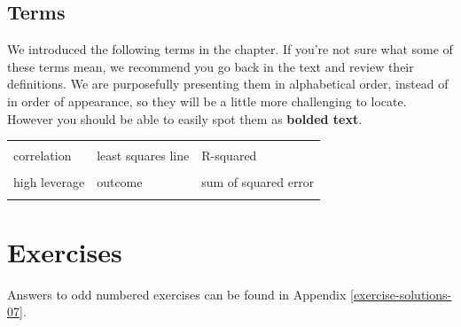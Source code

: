 \documentclass[
  10pt,
  openany]{book}
\begin{document}
\hypertarget{terms-4}{%
\subsection{Terms}\label{terms-4}}

We introduced the following terms in the chapter.
If you're not sure what some of these terms mean, we recommend you go back in the text and review their definitions.
We are purposefully presenting them in alphabetical order, instead of in order of appearance, so they will be a little more challenging to locate.
However you should be able to easily spot them as \textbf{bolded text}.

\begin{tabu} to 
\toprule
{} &  & \\
correlation & least squares line & R-squared\\
 &  & \\
high leverage & outcome & sum of squared error\\
 &  & \\
\bottomrule
\end{tabu}

\clearpage

\hypertarget{chp7-exercises}{%
\section{Exercises}\label{chp7-exercises}}

Answers to odd numbered exercises can be found in Appendix \ref{exercise-solutions-07}.
\end{document}

